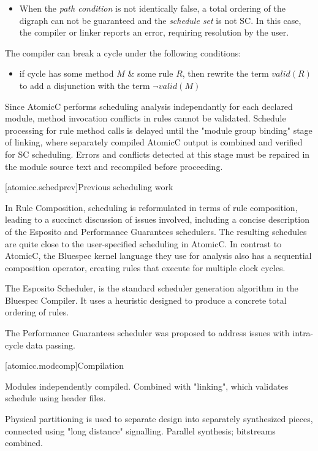 \begin{itemize}
\item When the \textit{path condition} is not identically false, a total ordering of
the digraph can not be guaranteed and the \textit{schedule set} is not SC.
In this case, the compiler or linker reports an error,
requiring resolution by the user.
\end{itemize}

The compiler can break a cycle under the following conditions:
\begin{itemize}
\item if cycle has some method $M$ \& some rule $R$, then
rewrite the term $valid(R)$ to add a disjunction with the term $\neg valid(M)$
\end{itemize}

Since AtomicC performs scheduling analysis independantly for each
declared module, method invocation conflicts in rules cannot be validated.
Schedule processing for rule method calls is delayed until the "module group binding"
stage of linking, where separately compiled AtomicC output is combined and
verified
for SC scheduling.  Errors and conflicts detected at this stage must be repaired
in the module source text and recompiled before proceeding.

[atomicc.schedprev]{Previous scheduling work}

In Rule Composition\cite{Dave2007}, scheduling
is reformulated in terms of rule composition, leading to a succinct discussion
of issues involved, including a concise description of the Esposito and
Performance Guarantees schedulers.  The resulting schedules are quite close
to the user-specified scheduling in AtomicC.
In contrast to AtomicC, the Bluespec kernel language they use
for analysis also has a sequential composition operator, creating rules
that execute for multiple clock cycles.

The Esposito Scheduler\cite{Esposito:Patent,Dave2007},
is the standard scheduler generation algorithm in the Bluespec Compiler.
It uses a heuristic designed to produce a concrete total ordering of rules.

The Performance Guarantees scheduler\cite{Rosenband:PerformanceGuarantees}
was proposed to address issues with intra-cycle data passing.

[atomicc.modcomp]{Compilation}

Modules independently compiled.  Combined with "linking", which validates schedule using header files.

Physical partitioning is used to separate design into separately synthesized pieces, connected using
"long distance" signalling.  Parallel synthesis; bitstreams combined.

